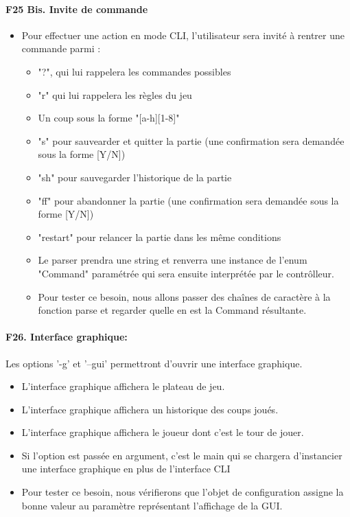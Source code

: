 \documentclass[a4paper,12pt]{article}
\begin{document}
\paragraph{F25 Bis. Invite de commande}
\begin{itemize}
  \item Pour effectuer une action en mode CLI, l'utilisateur sera invité à rentrer une
        commande parmi :
        \begin{itemize}
          \item "?", qui lui rappelera les commandes possibles
          \item "r" qui lui rappelera les règles du jeu
          \item Un coup sous la forme "[a-h][1-8]"
          \item "s" pour sauvearder et quitter la partie (une confirmation sera demandée sous la forme [Y/N])
          \item "sh" pour sauvegarder l'historique de la partie
          \item "ff" pour abandonner la partie (une confirmation sera demandée sous la forme [Y/N])
          \item "restart" pour relancer la partie dans les même conditions
          \item Le parser prendra une string et renverra une instance de l'enum "Command"
                paramétrée qui sera ensuite interprétée par le contrôlleur.
          \item Pour tester ce besoin, nous allons passer des chaînes de caractère à la
                fonction parse et regarder quelle en est la Command résultante.
        \end{itemize}
\end{itemize}

\paragraph{F26. Interface graphique:} Les options '-g' et '--gui' permettront d'ouvrir une interface graphique.
\begin{itemize}
  \item L'interface graphique affichera le plateau de jeu.
  \item L'interface graphique affichera un historique des coups joués.
  \item L'interface graphique affichera le joueur dont c'est le tour de jouer.
  \item Si l'option est passée en argument, c'est le main qui se chargera d'instancier
        une interface graphique en plus de l'interface CLI
  \item Pour tester ce besoin, nous vérifierons que l'objet de configuration assigne la
        bonne valeur au paramètre représentant l'affichage de la GUI.
\end{itemize}
\end{document}
